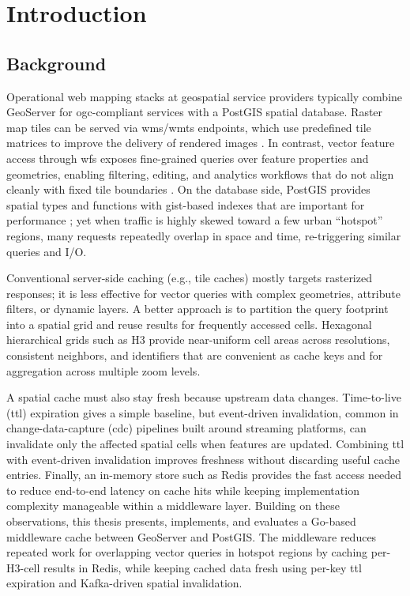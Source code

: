 \section{Introduction}

\subsection{Background}
Operational web mapping stacks at geospatial service providers typically combine GeoServer for \ac{ogc}-compliant services with a PostGIS spatial database. Raster map tiles can be served via \ac{wms}/\ac{wmts} endpoints, which use predefined tile matrices to improve the delivery of rendered images \cite{OGC_WMTS}. In contrast, vector feature access through \ac{wfs} exposes fine-grained queries over feature properties and geometries, enabling filtering, editing, and analytics workflows that do not align cleanly with fixed tile boundaries \cite{OGC_WFS}. On the database side, PostGIS provides spatial types and functions with \ac{gist}-based indexes that are important for performance \cite{PostGIS_Indexing}; yet when traffic is highly skewed toward a few urban “hotspot” regions, many requests repeatedly overlap in space and time, re-triggering similar queries and I/O. 

Conventional server-side caching (e.g., tile caches) mostly targets rasterized responses; it is less effective for vector queries with complex geometries, attribute filters, or dynamic layers. A better approach is to partition the query footprint into a spatial grid and reuse results for frequently accessed cells. Hexagonal hierarchical grids such as H3 provide near-uniform cell areas across resolutions, consistent neighbors, and identifiers that are convenient as cache keys and for aggregation across multiple zoom levels.

A spatial cache must also stay fresh because upstream data changes. Time-to-live (\ac{ttl}) expiration gives a simple baseline, but event-driven invalidation, common in change-data-capture (\ac{cdc}) pipelines built around streaming platforms, can invalidate only the affected spatial cells when features are updated. Combining \ac{ttl} with event-driven invalidation improves freshness without discarding useful cache entries. Finally, an in-memory store such as Redis provides the fast access needed to reduce end-to-end latency on cache hits while keeping implementation complexity manageable within a middleware layer. Building on these observations, this thesis presents, implements, and evaluates a Go-based middleware cache between GeoServer and PostGIS. The middleware reduces repeated work for overlapping vector queries in hotspot regions by caching per-H3-cell results in Redis, while keeping cached data fresh using per-key \ac{ttl} expiration and Kafka-driven spatial invalidation.


